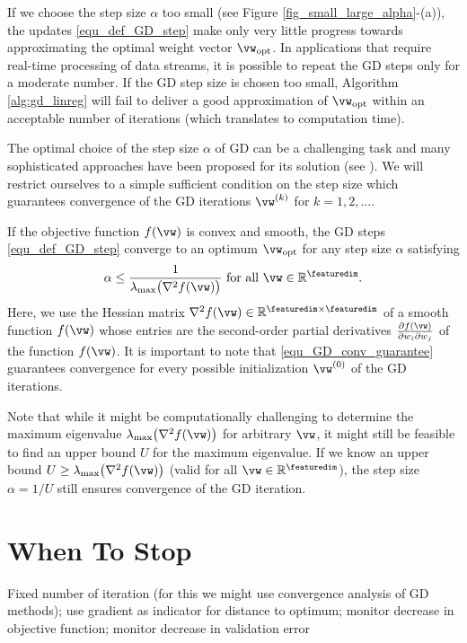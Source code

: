 \documentclass[12pt]{report}
\begin{document}
If we choose the step size $\alpha$ too small (see Figure \ref{fig_small_large_alpha}-(a)), 
the updates \eqref{equ_def_GD_step} make only very little progress towards 
approximating the optimal weight vector $\vw_{\rm opt}$. In applications that
require real-time processing of data streams, it is possible to repeat the GD 
steps only for a moderate number. If the GD step size is chosen too 
small, Algorithm \ref{alg:gd_linreg} will fail to deliver a good approximation 
of $\vw_{\rm opt}$ within an acceptable number of iterations (which translates 
to computation time). 

The optimal choice of the step size $\alpha$ of GD can be a challenging 
task and many sophisticated approaches have been proposed for its 
solution (see \cite[Chapter 8]{Goodfellow-et-al-2016}). We will restrict 
ourselves to a simple sufficient condition on the step size which guarantees 
convergence of the GD iterations $\vw^{(k)}$ for $k=1,2,\ldots$. 

If the objective function $f(\vw)$ is convex and smooth, the 
GD steps \eqref{equ_def_GD_step} converge to an optimum 
$\vw_{\rm opt}$ for any step size $\alpha$ satisfying \cite{nestrov04}
\begin{equation} 
\label{equ_GD_conv_guarantee}
\alpha \leq \frac{1}{\lambda_{\rm max} \big( \nabla^{2} f(\vw) \big) }\mbox{ for all } \vw \in \mathbb{R}^{\featuredim}. 
\end{equation} 
Here, we use the Hessian matrix $ \nabla^{2} f(\vw) \in \mathbb{R}^{\featuredim \times \featuredim}$ 
of a smooth function $f(\vw)$ whose entries are the second-order 
partial derivatives $\frac{\partial f(\vw)}{\partial w_{i} \partial w_{j}}$ 
of the function $f(\vw)$. It is important to note that \eqref{equ_GD_conv_guarantee} 
guarantees convergence for every possible initialization $\vw^{(0)}$ 
of the GD iterations. 

Note that while it might be computationally challenging to determine the maximum eigenvalue 
$\lambda_{\rm max} \big( \nabla^{2} f(\vw) \big)$ for arbitrary $\vw$, it might still be feasible to find an 
upper bound $U$ for the maximum eigenvalue. If we know an upper bound $U \geq \lambda_{\rm max} \big( \nabla^{2} f(\vw) \big)$ (valid for all $\vw \in \mathbb{R}^{\featuredim}$), 
the step size $\alpha =1/U$ still ensures convergence of the GD iteration.

\section{When To Stop} 
Fixed number of iteration (for this we might use convergence analysis of GD methods); 
use gradient as indicator for distance to optimum; monitor decrease in objective function; 
monitor decrease in validation error
\end{document}
